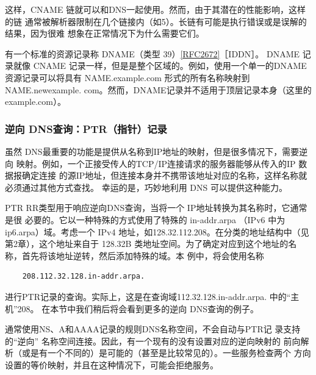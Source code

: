 这样，CNAME 链就可以和DNS一起使用。然而，由于其潜在的性能影响，这样的链
通常被解析器限制在几个链接内（如5）。长链有可能是执行错误或是误解的结果，因为很难
想象在正常情况下为什么需要它们。

\begin{tcolorbox}
    有一个标准的资源记录称 DNAME（类型 39）\href{https://www.rfc-editor.org/rfc/rfc2672}{[RFC2672]}［IDDN］。 DNAME
    记录就像 CNAME 记录一样，但是是整个区域的。例如，使用一个单一的DNAME
    资源记录可以将具有 NAME.example.com 形式的所有名称映射到 NAME.newexample.
    com。然而，DNAME记录并不适用于顶层记录本身（这里的 example.com）。
\end{tcolorbox}

\subsubsection{逆向 DNS查询：PTR（指针）记录}

虽然 DNS最重要的功能是提供从名称到IP地址的映射，但是很多情况下，需要逆向
映射。例如，一个正接受传人的TCP/IP连接请求的服务器能够从传入的IP 数据报确定连接
的源IP地址，但连接本身并不携带该地址对应的名称，这样名称就必须通过其他方式查找。
幸运的是，巧妙地利用 DNS 可以提供这种能力。

PTR RR类型用于响应逆向DNS查询，当将一个 IP地址转换为其名称时，它通常是很
必要的。它以一种特殊的方式使用了特殊的 in-addr.arpa （IPv6 中为 ip6.arpa）域。考虑一个
IPv4 地址，如128.32.112.208。在分类的地址结构中（见第2章），这个地址来自于 128.32B
类地址空间。为了确定对应到这个地址的名称，首先将该地址逆转，然后添加特殊的域。本
例中，将会使用名称


\begin{verbatim}
    208.112.32.128.in-addr.arpa.
\end{verbatim}

进行PTR记录的查询。实际上，这是在查询域112.32.128.in-addr.arpa. 中的“主机”208。
在本节中我们稍后将会看到更多的逆向 DNS查询的例子。

\begin{tcolorbox}
    通常使用NS、A和AAAA记录的规则DNS名称空间，不会自动与PTR记
    录支持的“逆向” 名称空间连接。因此，有一个现有的没有设置对应的逆向映射的
    前向解析（或是有一个不同的）是可能的（甚至是比较常见的）。一些服务检查两个
    方向设置的等价映射，并且在这种情况下，可能会拒绝服务。
\end{tcolorbox}

